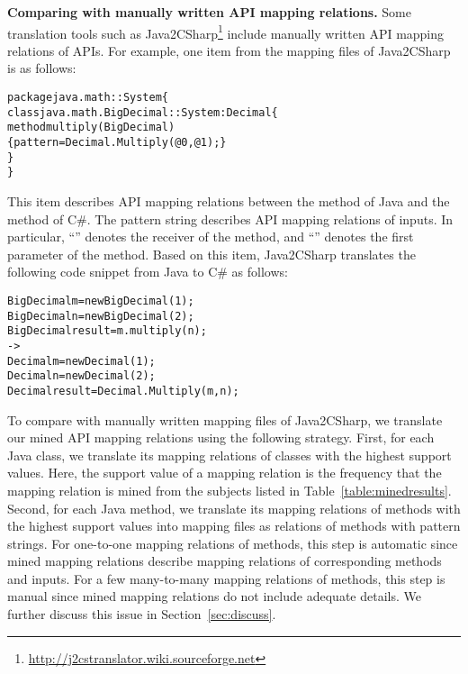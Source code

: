 \textbf{Comparing with manually written API mapping relations.} Some translation
tools such as
Java2CSharp\footnote{\url{http://j2cstranslator.wiki.sourceforge.net}}
include manually written API mapping relations of APIs.
For example, one item from the mapping files of Java2CSharp is as
follows:

\begin{CodeOut}\vspace*{-2ex}
\begin{alltt}
package java.math :: System \{
  class java.math.BigDecimal :: System:Decimal \{
    method multiply(BigDecimal)
       \{ pattern =  Decimal.Multiply(@0, @1); \}
  \}
\}
\end{alltt}
\end{CodeOut}\vspace*{-2ex}

This item describes API mapping relations between the 
method of Java and the  method of C\#. The pattern
string describes API mapping relations of inputs. In particular,
``'' denotes the receiver of the 
method, and ``'' denotes the first parameter of the
 method. Based on this item, Java2CSharp translates
the following code snippet from Java to C\# as follows:

\begin{CodeOut}\vspace*{-2ex}
\begin{alltt}
  BigDecimal m = new BigDecimal(1);
  BigDecimal n = new BigDecimal(2);
  BigDecimal result = m.multiply(n);
  ->
  Decimal m = new Decimal(1);
  Decimal n = new Decimal(2);
  Decimal result = Decimal.Multiply(m,n);
\end{alltt}
\end{CodeOut}\vspace*{-2ex}

To compare with manually written mapping files of Java2CSharp, we
translate our mined API mapping relations using the following strategy. First,
for each Java class, we translate its mapping relations of classes
with the highest support values. Here, the support value of a mapping relation is the frequency that the mapping relation is mined from the subjects listed in Table~\ref{table:minedresults}. Second, for each Java method, we translate its
mapping relations of methods with the highest support values into mapping
files as relations of methods with pattern strings. For one-to-one
mapping relations of methods, this step is automatic since mined
mapping relations describe mapping relations of corresponding
methods and inputs. For a few many-to-many mapping relations of methods,
this step is manual since mined mapping relations do not include
adequate details. We further discuss this issue in Section~\ref{sec:discuss}.

